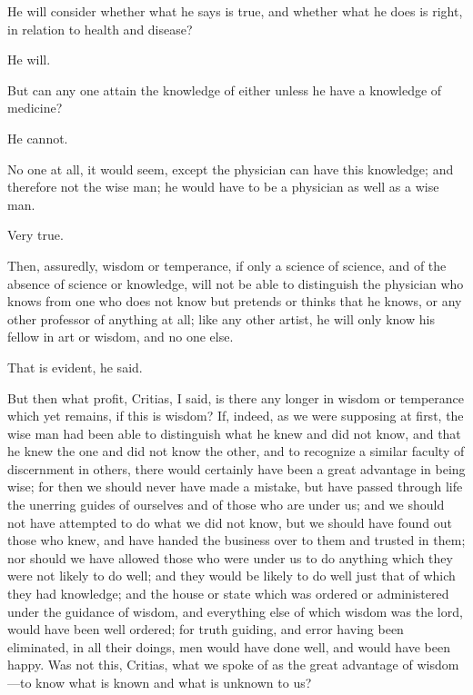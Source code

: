 \documentclass[11pt,letter]{article}
\begin{document}
\par  He will consider whether what he says is true, and whether what he does is right, in relation to health and disease?

\par  He will.

\par  But can any one attain the knowledge of either unless he have a knowledge of medicine?

\par  He cannot.

\par  No one at all, it would seem, except the physician can have this knowledge; and therefore not the wise man; he would have to be a physician as well as a wise man.

\par  Very true.

\par  Then, assuredly, wisdom or temperance, if only a science of science, and of the absence of science or knowledge, will not be able to distinguish the physician who knows from one who does not know but pretends or thinks that he knows, or any other professor of anything at all; like any other artist, he will only know his fellow in art or wisdom, and no one else.

\par  That is evident, he said.

\par  But then what profit, Critias, I said, is there any longer in wisdom or temperance which yet remains, if this is wisdom? If, indeed, as we were supposing at first, the wise man had been able to distinguish what he knew and did not know, and that he knew the one and did not know the other, and to recognize a similar faculty of discernment in others, there would certainly have been a great advantage in being wise; for then we should never have made a mistake, but have passed through life the unerring guides of ourselves and of those who are under us; and we should not have attempted to do what we did not know, but we should have found out those who knew, and have handed the business over to them and trusted in them; nor should we have allowed those who were under us to do anything which they were not likely to do well; and they would be likely to do well just that of which they had knowledge; and the house or state which was ordered or administered under the guidance of wisdom, and everything else of which wisdom was the lord, would have been well ordered; for truth guiding, and error having been eliminated, in all their doings, men would have done well, and would have been happy. Was not this, Critias, what we spoke of as the great advantage of wisdom—to know what is known and what is unknown to us?
\end{document}
